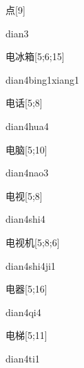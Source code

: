 \begin{verbete}[dian3]{点}[9]
\begin{pronuncia}{dian3}
\end{pronuncia}
\end{verbete}

\begin{verbete}{电冰箱}[5;6;15]
  \begin{pronuncia}[\\]{dian4bing1xiang1}
\end{pronuncia}
\end{verbete}

\begin{verbete}{电话}[5;8]
\begin{pronuncia}{dian4hua4}
\end{pronuncia}
\end{verbete}

\begin{verbete}{电脑}[5;10]
\begin{pronuncia}{dian4nao3}
\end{pronuncia}
\end{verbete}

\begin{verbete}{电视}[5;8]
\begin{pronuncia}{dian4shi4}
\end{pronuncia}
\end{verbete}

\begin{verbete}{电视机}[5;8;6]
\begin{pronuncia}{dian4shi4ji1}
\end{pronuncia}
\end{verbete}

\begin{verbete}[dian4qi4]{电器}[5;16]
\begin{pronuncia}{dian4qi4}
\end{pronuncia}
\end{verbete}

\begin{verbete}[dian4ti1]{电梯}[5;11]
\begin{pronuncia}{dian4ti1}
\end{pronuncia}
\end{verbete}

